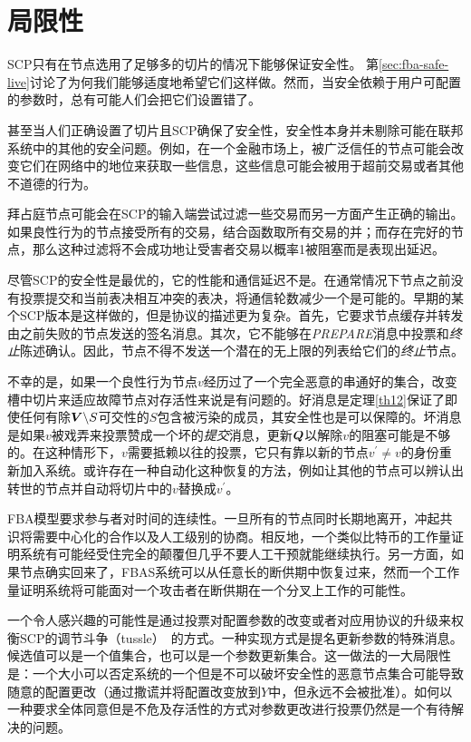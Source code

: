 \section{局限性}

SCP只有在节点选用了足够多的{\quorum}切片的情况下能够保证安全性。	第\ref{sec:fba-safe-live}讨论了为何我们能够适度地希望它们这样做。然而，当安全依赖于用户可配置的参数时，总有可能人们会把它们设置错了。

甚至当人们正确设置了{\quorum}切片且SCP确保了安全性，安全性本身并未剔除可能在联邦系统中的其他的安全问题。例如，在一个金融市场上，被广泛信任的节点可能会改变它们在网络中的地位来获取一些信息，这些信息可能会被用于超前交易或者其他不道德的行为。

拜占庭节点可能会在SCP的输入端尝试过滤一些交易而另一方面产生正确的输出。如果良性行为的节点接受所有的交易，结合函数取所有交易的并；而存在完好的节点，那么这种过滤将不会成功地让受害者交易以概率1被阻塞而是表现出延迟。

尽管SCP的安全性是最优的，它的性能和通信延迟不是。在通常情况下节点之前没有投票提交和当前表决相互冲突的表决，将通信轮数减少一个是可能的。早期的某个SCP版本是这样做的，但是协议的描述更为复杂。首先，它要求节点缓存并转发由之前失败的节点发送的签名消息。其次，它不能够在\textsl{PREPARE}消息中投票和\textit{终止}陈述确认。因此，节点不得不发送一个潜在的无上限的列表给它们的\textit{终止}节点。

不幸的是，如果一个良性行为节点$v$经历过了一个完全恶意的串通好的{\vblock}集合，改变槽中切片来适应故障节点对存活性来说是有问题的。好消息是定理\ref{th12}保证了即使任何有除${\bm V}\backslash S${\quorum}可交性的$S$包含被污染的成员，其安全性也是可以保障的。坏消息是如果$v$被戏弄来投票赞成一个坏的\textit{提交}消息，更新${\bm Q}$以解除$v$的阻塞可能是不够的。在这种情形下，$v$需要抵赖以往的投票，它只有靠以新的节点$v^{\prime}\neq v$的身份重新加入系统。或许存在一种自动化这种恢复的方法，例如让其他的节点可以辨认出转世的节点并自动将切片中的$v$替换成$v^{\prime}$。

FBA模型要求参与者对时间的连续性。一旦所有的节点同时长期地离开，冲起共识将需要中心化的合作以及人工级别的协商。相反地，一个类似比特币的工作量证明系统有可能经受住完全的颠覆但几乎不要人工干预就能继续执行。另一方面，如果节点确实回来了，FBAS系统可以从任意长的断供期中恢复过来，然而一个工作量证明系统将可能面对一个攻击者在断供期在一个分叉上工作的可能性。

一个令人感兴趣的可能性是通过投票对配置参数的改变或者对应用协议的升级来权衡SCP的调节斗争（tussle）~\cite{Clark:2005:TCD:1074047.1074049}的方式。一种实现方式是提名更新参数的特殊消息。候选值可以是一个值集合，也可以是一个参数更新集合。这一做法的一大局限性是：一个大小可以否定系统的一个{\quorum}但是不可以破坏安全性的恶意节点集合可能导致随意的配置更改（通过撒谎并将配置改变放到$Y$中，但永远不会被批准）。如何以一种要求全体{\quorum}同意但是不危及存活性的方式对参数更改进行投票仍然是一个有待解决的问题。